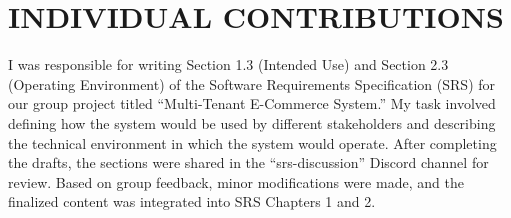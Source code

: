 \chapter{INDIVIDUAL CONTRIBUTIONS} \label{ch:data}
I was responsible for writing Section 1.3 (Intended Use) and Section 2.3 (Operating Environment) of the Software Requirements Specification (SRS) for our group project titled “Multi-Tenant E-Commerce System.” My task involved defining how the system would be used by different stakeholders and describing the technical environment in which the system would operate. After completing the drafts, the sections were shared in the “srs-discussion” Discord channel for review. Based on group feedback, minor modifications were made, and the finalized content was integrated into SRS Chapters 1 and 2.